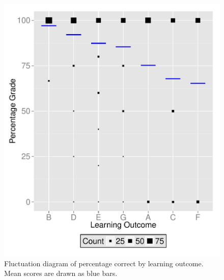 \documentclass[12pt,english,nohyper]{tufte-handout}\usepackage[]{graphicx}\usepackage[]{color}
\begin{document}
\vspace{5mm}

\begin{figure}[!ht]
\includegraphics[width=\linewidth]{Topic04_EF_LearningObj_boxplot.pdf}
\caption{Fluctuation diagram of percentage correct by learning outcome. Mean scores are drawn as blue bars.}
\label{fig:LearningObj_summary}
\end{figure}
\end{document}
